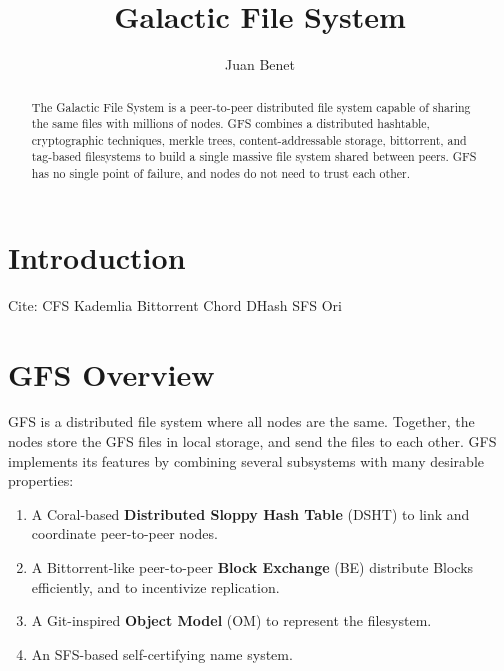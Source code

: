 \documentclass{sig-alternate}
\begin{document}

\title{Galactic File System}
\subtitle{}


\author{
%
%
\alignauthor
  Juan Benet\\
}

\maketitle
\begin{abstract}
The Galactic File System is a peer-to-peer distributed file system capable of
sharing the same files with millions of nodes. GFS combines a distributed
hashtable, cryptographic techniques, merkle trees, content-addressable
storage, bittorrent, and tag-based filesystems to build a single massive
file system shared between peers. GFS has no single point of failure, and
nodes do not need to trust each other.
\end{abstract}

\section{Introduction}

Cite:
CFS
Kademlia
Bittorrent
Chord
DHash
SFS
Ori

\section{GFS Overview}

GFS is a distributed file system where all nodes are the same. Together, the
nodes store the GFS files in local storage, and send the files to each other.
GFS implements its features by combining several subsystems with many
desirable properties:

\begin{enumerate}
  \item A Coral-based \textbf{Distributed Sloppy Hash Table} (DSHT) to link and
        coordinate peer-to-peer nodes.
  \item A Bittorrent-like peer-to-peer \textbf{Block Exchange} (BE) distribute
        Blocks efficiently, and to incentivize replication.
  \item A Git-inspired \textbf{Object Model} (OM) to represent the filesystem.
  \item An SFS-based self-certifying name system.
\end{enumerate}
\end{document}
